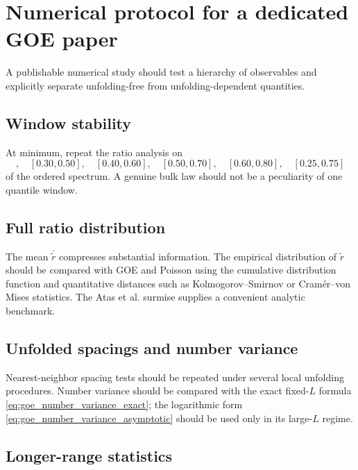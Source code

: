 \documentclass[11pt]{amsart}
\numberwithin{equation}{section}
\theoremstyle{plain}
\theoremstyle{definition}
\theoremstyle{remark}
\begin{document}
\section{Numerical protocol for a dedicated GOE paper}
\label{sec:numerical_protocol}

A publishable numerical study should test a hierarchy of observables and explicitly separate unfolding-free from unfolding-dependent quantities.

\subsection{Window stability}
\label{subsec:window_stability}

At minimum, repeat the ratio analysis on
\begin{equation}
[0.20,0.40],\quad
[0.30,0.50],\quad
[0.40,0.60],\quad
[0.50,0.70],\quad
[0.60,0.80],\quad
[0.25,0.75]
\label{eq:recommended_windows}
\end{equation}
of the ordered spectrum.  A genuine bulk law should not be a peculiarity of one quantile window.

\subsection{Full ratio distribution}
\label{subsec:full_ratio_distribution}

The mean $\overline{\widetilde r}$ compresses substantial information.  The empirical distribution of $\widetilde r$ should be compared with GOE and Poisson using the cumulative distribution function and quantitative distances such as Kolmogorov--Smirnov or Cram\'er--von Mises statistics.  The Atas et al. surmise \cite{Atas2013} supplies a convenient analytic benchmark.

\subsection{Unfolded spacings and number variance}
\label{subsec:spacing_number_protocol}

Nearest-neighbor spacing tests should be repeated under several local unfolding procedures.  Number variance should be compared with the exact fixed-$L$ formula \eqref{eq:goe_number_variance_exact}; the logarithmic form \eqref{eq:goe_number_variance_asymptotic} should be used only in its large-$L$ regime.

\subsection{Longer-range statistics}
\label{subsec:long_range_protocol}
\end{document}
